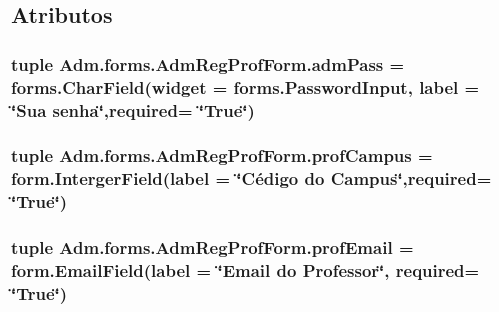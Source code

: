 \subsection{Atributos}
\hypertarget{classAdm_1_1forms_1_1AdmRegProfForm_aa9a564546d369e53f8512a473669b78d}{
\subsubsection[{adm\-Pass}]{\setlength{\rightskip}{0pt plus 5cm}tuple Adm.\-forms.\-Adm\-Reg\-Prof\-Form.\-adm\-Pass = forms.\-Char\-Field(widget = forms.\-Password\-Input, label = \char`\"{}Sua senha\char`\"{},required= \char`\"{}True\char`\"{})\hspace{0.3cm}{\ttfamily [static]}}}\label{classAdm_1_1forms_1_1AdmRegProfForm_aa9a564546d369e53f8512a473669b78d}
\hypertarget{classAdm_1_1forms_1_1AdmRegProfForm_a0c90beb927b61260feb194030798db38}{
\subsubsection[{prof\-Campus}]{\setlength{\rightskip}{0pt plus 5cm}tuple Adm.\-forms.\-Adm\-Reg\-Prof\-Form.\-prof\-Campus = form.\-Interger\-Field(label = \char`\"{}Cédigo do Campus\char`\"{},required= \char`\"{}True\char`\"{})\hspace{0.3cm}{\ttfamily [static]}}}\label{classAdm_1_1forms_1_1AdmRegProfForm_a0c90beb927b61260feb194030798db38}
\hypertarget{classAdm_1_1forms_1_1AdmRegProfForm_a56c1eca35253b136bf8886135c9633b0}{
\subsubsection[{prof\-Email}]{\setlength{\rightskip}{0pt plus 5cm}tuple Adm.\-forms.\-Adm\-Reg\-Prof\-Form.\-prof\-Email = form.\-Email\-Field(label = \char`\"{}Email do Professor\char`\"{}, required= \char`\"{}True\char`\"{})\hspace{0.3cm}{\ttfamily [static]}}}\label{classAdm_1_1forms_1_1AdmRegProfForm_a56c1eca35253b136bf8886135c9633b0}
